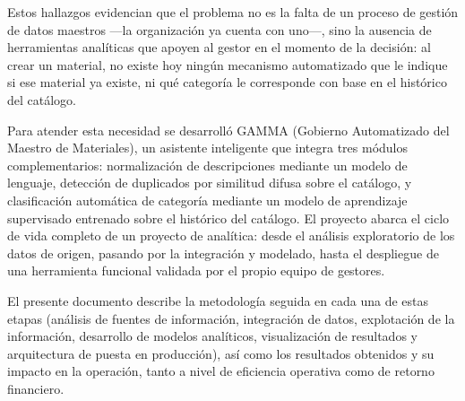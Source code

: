Estos hallazgos evidencian que el problema no es la falta de un proceso de gestión de datos maestros —la organización ya cuenta con uno—, sino la ausencia de herramientas analíticas que apoyen al gestor en el momento de la decisión: al crear un material, no existe hoy ningún mecanismo automatizado que le indique si ese material ya existe, ni qué categoría le corresponde con base en el histórico del catálogo.

Para atender esta necesidad se desarrolló GAMMA (Gobierno Automatizado del Maestro de Materiales), un asistente inteligente que integra tres módulos complementarios: normalización de descripciones mediante un modelo de lenguaje, detección de duplicados por similitud difusa sobre el catálogo, y clasificación automática de categoría mediante un modelo de aprendizaje supervisado entrenado sobre el histórico del catálogo. El proyecto abarca el ciclo de vida completo de un proyecto de analítica: desde el análisis exploratorio de los datos de origen, pasando por la integración y modelado, hasta el despliegue de una herramienta funcional validada por el propio equipo de gestores.

El presente documento describe la metodología seguida en cada una de estas etapas (análisis de fuentes de información, integración de datos, explotación de la información, desarrollo de modelos analíticos, visualización de resultados y arquitectura de puesta en producción), así como los resultados obtenidos y su impacto en la operación, tanto a nivel de eficiencia operativa como de retorno financiero.